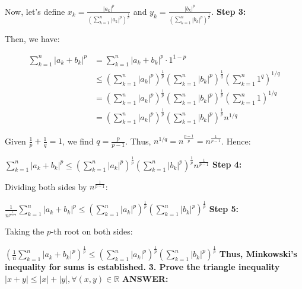 \documentclass{article}
\begin{document}
\begin{flushleft}
Now, let's define $x_k = \frac{|a_k|^p}{\left(\sum_{k=1}^n |a_k|^p\right)^{\frac{1}{p}}}$ and $y_k = \frac{|b_k|^p}{\left(\sum_{k=1}^n |b_k|^p\right)^{\frac{1}{p}}}$. 
\newline\newline
\textbf{Step 3:}

Then, we have:

\begin{align*}
\sum_{k=1}^n |a_k + b_k|^p &= \sum_{k=1}^n |a_k + b_k|^p \cdot 1^{1-p} \\
&\leq \left( \sum_{k=1}^n |a_k|^p \right)^{\frac{1}{p}} \left( \sum_{k=1}^n |b_k|^p \right)^{\frac{1}{q}} \left( \sum_{k=1}^n 1^{q} \right)^{1/q} \\
&= \left( \sum_{k=1}^n |a_k|^p \right)^{\frac{1}{p}} \left( \sum_{k=1}^n |b_k|^p \right)^{\frac{1}{p}} \left( \sum_{k=1}^n 1 \right)^{1/q} \\
&= \left( \sum_{k=1}^n |a_k|^p \right)^{\frac{1}{p}} \left( \sum_{k=1}^n |b_k|^p \right)^{\frac{1}{p}} n^{1/q}
\end{align*}

Given $\frac{1}{p} + \frac{1}{q} = 1$, we find $q = \frac{p}{p-1}$.
\newline\newline
Thus, $n^{1/q} = n^{\frac{p-1}{p}} = n^{\frac{1}{p-1}}$.
\newline\newline
Hence:

$\sum_{k=1}^n |a_k + b_k|^p \leq \left( \sum_{k=1}^n |a_k|^p \right)^{\frac{1}{p}} \left( \sum_{k=1}^n |b_k|^p \right)^{\frac{1}{p}} n^{\frac{1}{p-1}}$
\newline\newline
\textbf{Step 4:}

Dividing both sides by $n^{\frac{1}{p-1}}$:

$\frac{1}{n^{\frac{1}{p-1}}} \sum_{k=1}^n |a_k + b_k|^p \leq \left( \sum_{k=1}^n |a_k|^p \right)^{\frac{1}{p}} \left( \sum_{k=1}^n |b_k|^p \right)^{\frac{1}{p}}$
\newline\newline\newline\newline
\textbf{Step 5:}

Taking the $p$-th root on both sides:

$\left( \frac{1}{n} \sum_{k=1}^n |a_k + b_k|^p \right)^{\frac{1}{p}} \leq \left( \sum_{k=1}^n |a_k|^p \right)^{\frac{1}{p}} \left( \sum_{k=1}^n |b_k|^p \right)^{\frac{1}{p}}$
\newline\newline
\textbf{Thus, Minkowski's inequality for sums is established.}
\newline\newline
\textbf{3. Prove the triangle inequality $|x+y| \leq |x| + |y|, \forall (x,y) \in \mathbb{R}$}
\newline\newline\newline\newline\newline\newline
\textbf{ANSWER:}


\end{flushleft}
\end{document}
